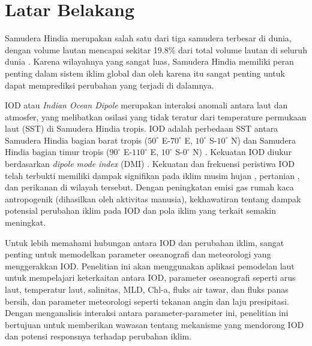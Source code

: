 \vspace{1.5pc}
\section[Latar Belakang]{Latar Belakang}
\begin{spacing}{1.5}
	Samudera Hindia merupakan salah satu dari tiga samudera terbesar di dunia, dengan volume lautan mencapai sekitar 19.8\% dari total volume lautan di seluruh dunia \cite{Eakins2010}. Karena wilayahnya yang sangat luas, Samudera Hindia memiliki peran penting dalam sistem iklim global dan oleh karena itu sangat penting untuk dapat memprediksi perubahan yang terjadi di dalamnya.
	
	IOD atau \textit{Indian Ocean Dipole} merupakan interaksi anomali antara laut dan atmosfer, yang melibatkan osilasi yang tidak teratur dari temperature permukaan laut (SST) di Samudera Hindia tropis. IOD adalah perbedaan SST antara Samudera Hindia bagian barat tropis ($50^\circ$ E-$70^\circ$ E, $10^\circ$ S-$10^\circ$ N) dan Samudera Hindia bagian timur tropis ($90^\circ$ E-$110^\circ$ E, $10^\circ$ S-$0^\circ$ N) \cite{Shunmugapandi2022,Thushara2020,Sattar2019}. Kekuatan IOD diukur berdasarkan \textit{dipole mode index} (DMI) \cite{Saji1999}. Kekuatan dan frekuensi peristiwa IOD telah terbukti memiliki dampak signifikan pada iklim musim hujan \cite{Qiu2014}, pertanian \cite{Zhang2016}, dan perikanan \cite{Lan2013} di wilayah tersebut. Dengan peningkatan emisi gas rumah kaca antropogenik (dihasilkan oleh aktivitas manusia), kekhawatiran tentang dampak potensial perubahan iklim pada IOD dan pola iklim yang terkait semakin meningkat.
	
	Untuk lebih memahami hubungan antara IOD dan perubahan iklim, sangat penting untuk memodelkan parameter oseanografi dan meteorologi yang menggerakkan IOD. Penelitian ini akan menggunakan aplikasi pemodelan laut untuk mempelajari keterkaitan antara IOD, parameter oseanografi seperti arus laut, temperatur laut, salinitas, MLD, Chl-a, fluks air tawar, dan fluks panas bersih, dan parameter meteorologi seperti tekanan angin dan laju presipitasi. Dengan menganalisis interaksi antara parameter-parameter ini, penelitian ini bertujuan untuk memberikan wawasan tentang mekanisme yang mendorong IOD dan potensi responsnya terhadap perubahan iklim.
	

\end{spacing}
